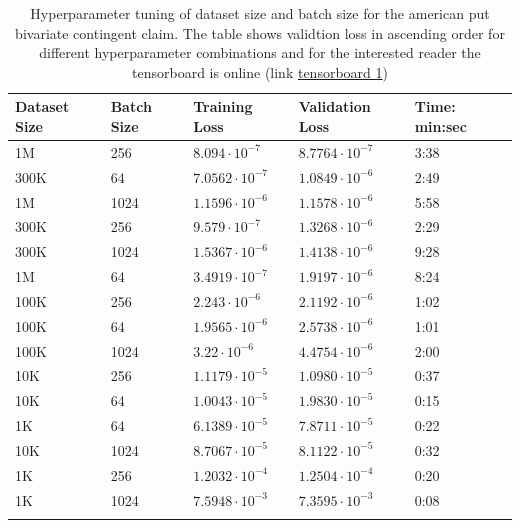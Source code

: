 \begin{table}[th]
\caption{Hyperparameter tuning of dataset size and batch size for the american put bivariate contingent claim. The table shows validtion loss in ascending order for different hyperparameter combinations and for the interested reader the tensorboard is online (link \href{https://tensorboard.dev/experiment/8pxUoSDmTVGMOxpJWgiZsA/}{tensorboard 1})}
\label{tab:hyperEuroC1}
\centering
\begin{tabular}{lllll}
\toprule
\textbf{Dataset Size} & \textbf{Batch Size} & \textbf{Training Loss} & \textbf{Validation Loss} & \textbf{Time: min:sec}\\
\midrule
1M    & 256   & $8.094\cdot 10^{-7}$ & $8.7764\cdot 10^{-7}$ & 3:38 \\ 
300K  & 64    & $7.0562\cdot 10^{-7}$ & $1.0849\cdot 10^{-6}$ & 2:49 \\ 
1M    & 1024  & $1.1596\cdot 10^{-6}$ & $1.1578\cdot 10^{-6}$ & 5:58 \\ 
300K  & 256   & $9.579\cdot 10^{-7}$ & $1.3268\cdot 10^{-6}$ & 2:29 \\ 
300K  & 1024  & $1.5367\cdot 10^{-6}$ & $1.4138\cdot 10^{-6}$ & 9:28 \\ 
1M   & 64    & $3.4919\cdot 10^{-7}$ & $1.9197\cdot 10^{-6}$ & 8:24\\ 
100K  & 256   & $2.243\cdot 10^{-6}$ & $2.1192\cdot 10^{-6}$ & 1:02  \\ 
100K  & 64    & $1.9565\cdot 10^{-6}$ & $2.5738\cdot 10^{-6}$ & 1:01 \\ 
100K  & 1024  & $3.22\cdot 10^{-6}$ & $4.4754\cdot 10^{-6}$ & 2:00\\ 
10K  & 256   & $1.1179\cdot 10^{-5}$ & $1.0980\cdot 10^{-5}$ & 0:37 \\ 
10K   & 64    & $1.0043\cdot 10^{-5}$ & $1.9830\cdot 10^{-5}$ & 0:15 \\ 
1K   & 64    & $6.1389\cdot 10^{-5}$ & $7.8711\cdot 10^{-5}$ & 0:22\\ 
10K   & 1024 & $8.7067\cdot 10^{-5}$ & $8.1122\cdot 10^{-5}$ & 0:32  \\ 
1K   & 256   & $1.2032\cdot 10^{-4}$ & $1.2504\cdot 10^{-4}$ & 0:20    \\ 
1K    & 1024  & $7.5948\cdot 10^{-3}$ & $7.3595\cdot 10^{-3}$ & 0:08    \\ 
\bottomrule\\
\end{tabular}
\end{table}

